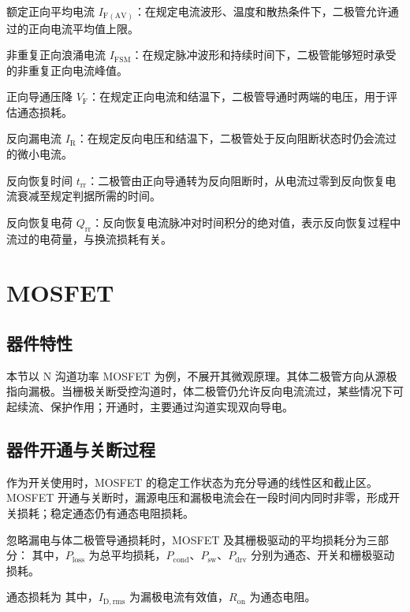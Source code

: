 额定正向平均电流 $I_{\mathrm{F(AV)}}$：在规定电流波形、温度和散热条件下，二极管允许通过的正向电流平均值上限。

非重复正向浪涌电流 $I_{\mathrm{FSM}}$：在规定脉冲波形和持续时间下，二极管能够短时承受的非重复正向电流峰值。

正向导通压降 $V_{\mathrm{F}}$：在规定正向电流和结温下，二极管导通时两端的电压，用于评估通态损耗。

反向漏电流 $I_{\mathrm{R}}$：在规定反向电压和结温下，二极管处于反向阻断状态时仍会流过的微小电流。

反向恢复时间 $t_{\mathrm{rr}}$：二极管由正向导通转为反向阻断时，从电流过零到反向恢复电流衰减至规定判据所需的时间。

反向恢复电荷 $Q_{\mathrm{rr}}$：反向恢复电流脉冲对时间积分的绝对值，表示反向恢复过程中流过的电荷量，与换流损耗有关。

\newpage{}

\section{MOSFET}

\subsection{器件特性}

本节以 N 沟道功率 MOSFET 为例，不展开其微观原理。其体二极管方向从源极指向漏极。当栅极关断受控沟道时，体二极管仍允许反向电流流过，某些情况下可起续流、保护作用；开通时，主要通过沟道实现双向导电。


\subsection{器件开通与关断过程}

作为开关使用时，MOSFET 的稳定工作状态为充分导通的线性区和截止区。MOSFET 开通与关断时，漏源电压和漏极电流会在一段时间内同时非零，形成开关损耗；稳定通态仍有通态电阻损耗。


忽略漏电与体二极管导通损耗时，MOSFET 及其栅极驱动的平均损耗分为三部分：
其中，$P_{\mathrm{loss}}$ 为总平均损耗，$P_{\mathrm{cond}}$、$P_{\mathrm{sw}}$、$P_{\mathrm{drv}}$ 分别为通态、开关和栅极驱动损耗。

通态损耗为
其中，$I_{\mathrm{D,rms}}$ 为漏极电流有效值，$R_{\mathrm{on}}$ 为通态电阻。

